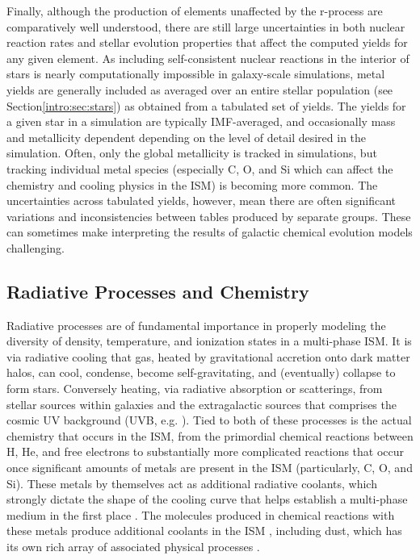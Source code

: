 Finally, although the production of elements unaffected by the r-process are comparatively well understood, there are still large uncertainties in both nuclear reaction rates and stellar evolution properties that affect the computed yields for any given element. As including self-consistent nuclear reactions in the interior of stars is nearly computationally impossible in galaxy-scale simulations, metal yields are generally included as averaged over an entire stellar population (see Section\ref{intro:sec:stars}) as obtained from a tabulated set of yields. The yields for a given star in a simulation are typically IMF-averaged, and occasionally mass and metallicity dependent depending on the level of detail desired in the simulation. Often, only the global metallicity is tracked in simulations, but tracking individual metal species (especially C, O, and Si which can affect the chemistry and cooling physics in the ISM) is becoming more common. The uncertainties across tabulated yields, however, mean there are often significant variations and inconsistencies between tables produced by separate groups. These can sometimes make interpreting the results of galactic chemical evolution models challenging.

\subsection{Radiative Processes and Chemistry}
\label{intro:sec:cooling}

Radiative processes are of fundamental importance in properly modeling the diversity of density, temperature, and ionization states in a multi-phase ISM. It is via radiative cooling that gas, heated by gravitational accretion onto dark matter halos, can cool, condense, become self-gravitating, and (eventually) collapse to form stars. Conversely heating, via radiative absorption or scatterings, from stellar sources within galaxies and the extragalactic sources that comprises the cosmic UV background (UVB, e.g. \cite{HM2001,HM2012,FG2011}). Tied to both of these processes is the actual chemistry that occurs in the ISM, from the primordial chemical reactions between H, He, and free electrons to substantially more complicated reactions that occur once significant amounts of metals are present in the ISM (particularly, C, O, and Si). These metals by themselves act as additional radiative coolants, which strongly dictate the shape of the cooling curve that helps establish a multi-phase medium in the first place \citep[e.g.][]{McKeeOstriker1977}. The molecules produced in chemical reactions with these metals produce additional coolants in the ISM \citep{HollenbachMcKee1979}, including dust, which has its own rich array of associated physical processes \citep{Omukai2000,Omukai2005,Draine2011}.

